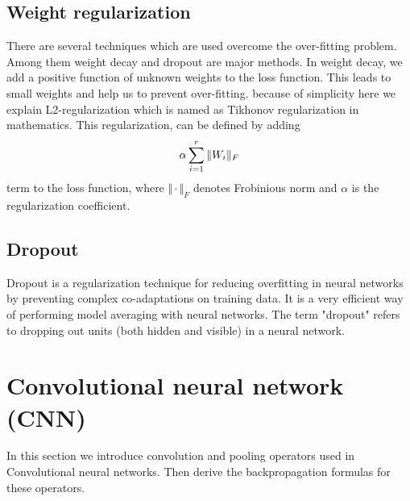 \documentclass[10pt]{SelfArx} %
\begin{document}
\subsection{Weight regularization}
There are several techniques which are used overcome the over-fitting problem. Among them weight decay and dropout are major methods. In weight decay, we add a positive function of unknown weights to the loss function. This leads to small weights and help us to prevent over-fitting. because of simplicity here we explain L2-regularization which is named as Tikhonov regularization in mathematics.
This regularization, can be defined by adding 
\begin{equation}
\centering
\alpha \sum_{i=1}^r \Vert W_i \Vert_F
\end{equation}
term to the loss function, where $\Vert \cdot \Vert_F$ denotes Frobinious norm and $\alpha$ is the regularization coefficient.
\subsection{Dropout}
Dropout is a regularization technique for reducing overfitting in neural networks by preventing complex co-adaptations on training data. It is a very efficient way of performing model averaging with neural networks. The term "dropout" refers to dropping out units (both hidden and visible) in a neural network.
\section{Convolutional neural network (CNN)}
In this section we introduce convolution and pooling operators used in Convolutional neural networks. Then derive the backpropagation formulas for these operators. 
\end{document}
